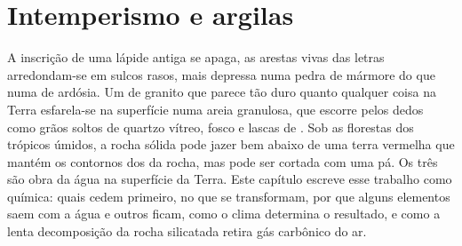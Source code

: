 \chapter{Intemperismo e argilas}\label{ch:b1:weathering-clays}

A inscrição de uma lápide antiga se apaga, as arestas vivas das letras arredondam-se em sulcos rasos, mais depressa numa pedra de mármore do que numa de ardósia. Um  de granito que parece tão duro quanto qualquer coisa na Terra esfarela-se na superfície numa areia granulosa, que escorre pelos dedos como grãos soltos de quartzo vítreo,  fosco e lascas de . Sob as florestas dos trópicos úmidos, a rocha sólida pode jazer bem abaixo de uma terra vermelha que mantém os contornos dos  da rocha, mas pode ser cortada com uma pá. Os três são obra da água na superfície da Terra. Este capítulo escreve esse trabalho como química: quais  cedem primeiro, no que se transformam, por que alguns elementos saem com a água e outros ficam, como o clima determina o resultado, e como a lenta decomposição da rocha silicatada retira gás carbônico do ar.

